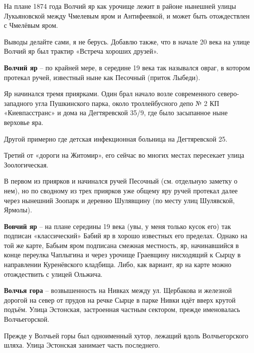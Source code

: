 На плане 1874 года Волчий яр как урочище лежит в районе нынешней улицы Лукьяновской между Чмелевым яром и Антифеевкой, и может быть отождествлен с Чмелёвым яром.

Выводы делайте сами, я не берусь. Добавлю также, что в начале 20 века на улице Волчий яр был трактир «Встреча хороших друзей».\\

\medskip

\textbf{Волчий яр} – по крайней мере, в середине 19 века так назывался овраг, в котором протекал ручей, известный ныне как Песочный (приток Лыбеди).

Яр начинался тремя приярками. Один брал начало возле современного северо-западного угла Пушкинского парка, около троллейбусного депо № 2 КП «Киевпасстранс» и дома на Дегтяревской 35/9, где было засыпанное ныне верховье яра.

Другой примерно где детская инфекционная больница на Дегтяревской 25. 

Третий от «дороги на Житомир», его сейчас во многих местах пересекает улица Зоологическая. 

В первом из приярков и начинался ручей Песочный (см. отдельную заметку о нем), но по сводному из трех приярков уже общему яру ручей протекал далее через нынешний Зоопарк и деревню Шулявщину (по месту улиц Шулявской, Ярмолы).\\

\medskip

\textbf{Вовчий яр} – на плане середины 19 века (увы, у меня только кусок его) так подписан «классический» Бабий яр в хорошо известных его пределах. Однако на той же карте, Бабьим яром подписана смежная местность, яр, начинавшийся в конце переулка Чаплыгина и через урочище Граевщину нисходящий к Сырцу в направлении Куренёвского кладбища. Либо, как вариант, яр на карте можно отождествить с улицей Ольжича.\\

\medskip

\textbf{Волчья гора} – возвышенность на Нивках между ул. Щербакова и железной дорогой на север от прудов на речке Сырце в парке Нивки идёт вверх крутой подъём. Улица Эстонская, застроенная частным сектором, прежде именовалась Волчьегорской.

Прежде у Волчьей горы был одноименный хутор, лежащий вдоль Волчьегорского шляха. Улица Эстонская занимает часть последнего.\\

\medskip


